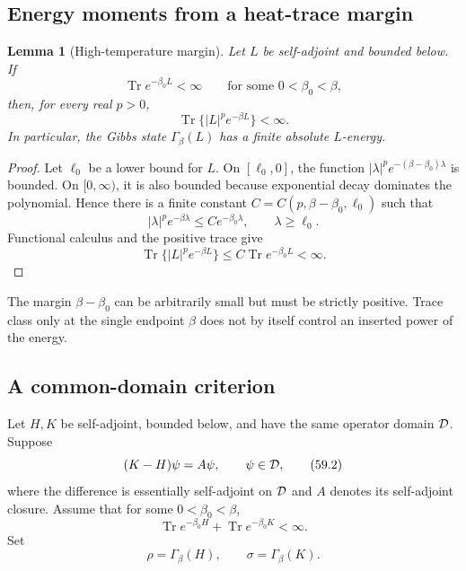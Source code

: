 \documentclass[11pt]{article}
\newtheorem{lemma}[theorem]{Lemma}
\theoremstyle{remark}
\begin{document}
\subsection{Energy moments from a heat-trace margin}

\begin{lemma}[High-temperature margin]
\label{lem:v12v59-heat-margin}
Let \(L\) be self-adjoint and bounded below.  If
\[
 \operatorname{Tr}e^{-\beta_0L}<\infty
 \qquad\text{for some }0<\beta_0<\beta,
\]
then, for every real \(p>0\),
\begin{equation}
 \operatorname{Tr}\{|L|^p e^{-\beta L}\}<\infty.  \tag{59.1}
\end{equation}
In particular, the Gibbs state
\(\Gamma_\beta(L)\) has a finite absolute \(L\)-energy.
\end{lemma}

\begin{proof}
Let \(\ell_0\) be a lower bound for \(L\).  On
\([\ell_0,0]\), the function
\(|\lambda|^pe^{-(\beta-\beta_0)\lambda}\) is bounded.  On
\([0,\infty)\), it is also bounded because exponential decay
dominates the polynomial.  Hence there is a finite constant
\(C=C(p,\beta-\beta_0,\ell_0)\) such that
\[
 |\lambda|^pe^{-\beta\lambda}
 \leq C e^{-\beta_0\lambda},
 \qquad\lambda\geq\ell_0.
\]
Functional calculus and the positive trace give
\[
 \operatorname{Tr}\{|L|^pe^{-\beta L}\}
 \leq C\operatorname{Tr}e^{-\beta_0L}<\infty.
\]
\end{proof}

The margin \(\beta-\beta_0\) can be arbitrarily small but must be
strictly positive.  Trace class only at the single endpoint
\(\beta\) does not by itself control an inserted power of the
energy.

\subsection{A common-domain criterion}

Let \(H,K\) be self-adjoint, bounded below, and have the same
operator domain \({\cal D}\).  Suppose
\[
 (K-H)\psi=A\psi,\qquad\psi\in{\cal D},            \tag{59.2}
\]
where the difference is essentially self-adjoint on \({\cal D}\)
and \(A\) denotes its self-adjoint closure.  Assume that for some
\(0<\beta_0<\beta\),
\begin{equation}
 \operatorname{Tr}e^{-\beta_0H}
 +
 \operatorname{Tr}e^{-\beta_0K}<\infty.           \tag{59.3}
\end{equation}
Set
\[
 \rho=\Gamma_\beta(H),\qquad
 \sigma=\Gamma_\beta(K).
\]
\end{document}
